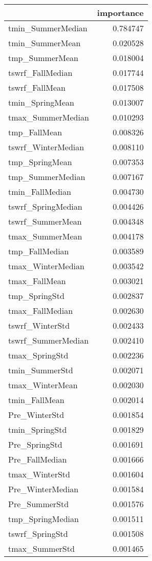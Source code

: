 \begin{tabular}{lr}
\toprule
 & importance \\
\midrule
tmin_SummerMedian & 0.784747 \\
tmin_SummerMean & 0.020528 \\
tmp_SummerMean & 0.018004 \\
tswrf_FallMedian & 0.017744 \\
tswrf_FallMean & 0.017508 \\
tmin_SpringMean & 0.013007 \\
tmax_SummerMedian & 0.010293 \\
tmp_FallMean & 0.008326 \\
tswrf_WinterMedian & 0.008110 \\
tmp_SpringMean & 0.007353 \\
tmp_SummerMedian & 0.007167 \\
tmin_FallMedian & 0.004730 \\
tswrf_SpringMedian & 0.004426 \\
tswrf_SummerMean & 0.004348 \\
tmax_SummerMean & 0.004178 \\
tmp_FallMedian & 0.003589 \\
tmax_WinterMedian & 0.003542 \\
tmax_FallMean & 0.003021 \\
tmp_SpringStd & 0.002837 \\
tmax_FallMedian & 0.002630 \\
tswrf_WinterStd & 0.002433 \\
tswrf_SummerMedian & 0.002410 \\
tmax_SpringStd & 0.002236 \\
tmin_SummerStd & 0.002071 \\
tmax_WinterMean & 0.002030 \\
tmin_FallMean & 0.002014 \\
Pre_WinterStd & 0.001854 \\
tmin_SpringStd & 0.001829 \\
Pre_SpringStd & 0.001691 \\
Pre_FallMedian & 0.001666 \\
tmax_WinterStd & 0.001604 \\
Pre_WinterMedian & 0.001584 \\
Pre_SummerStd & 0.001576 \\
tmp_SpringMedian & 0.001511 \\
tswrf_SpringStd & 0.001508 \\
tmax_SummerStd & 0.001465 \\

\end{tabular}
